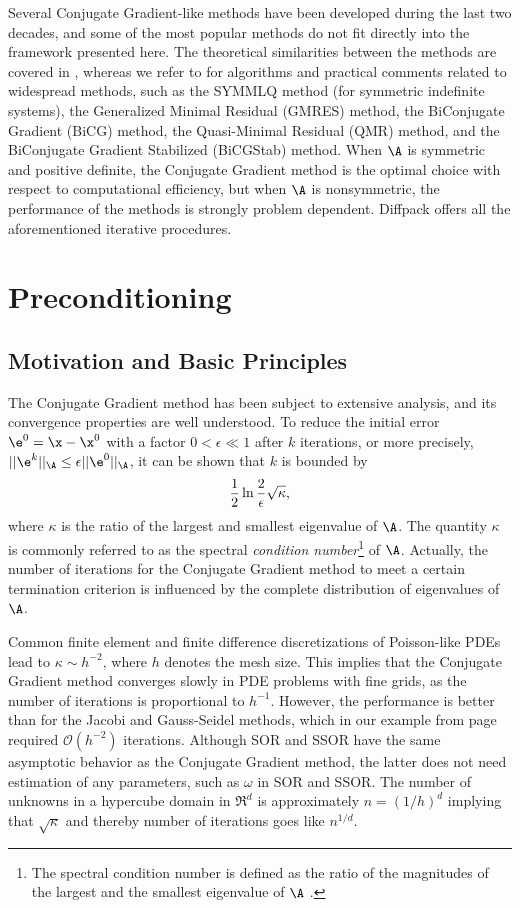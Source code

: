 Several Conjugate Gradient-like methods have been developed during the
last two decades, and some of the most popular methods do not fit
directly into the framework presented here.  The theoretical
similarities between the methods are covered in \cite{BruBok}, whereas
we refer to \cite{linalgtemplates93} for algorithms and practical
comments related to widespread methods, such as the SYMMLQ method (for
symmetric indefinite systems), the Generalized Minimal Residual
(GMRES) method, the BiConjugate Gradient (BiCG) method, the
Quasi-Minimal Residual (QMR) method, and the BiConjugate Gradient
Stabilized (BiCGStab) method.  When $\A$ is symmetric and positive
definite, the Conjugate Gradient method is the optimal choice with
respect to computational efficiency, but when $\A$ is nonsymmetric,
the performance of the methods is strongly problem dependent.
Diffpack offers all the aforementioned iterative procedures.


\section{Preconditioning}
\label{ch:linalg2:preconditioning}

\subsection{Motivation and Basic Principles}
\label{ch:linalg2:condno}
The Conjugate Gradient method has been subject to extensive analysis,
and its convergence properties are well understood.
To reduce the initial error $\e^0 =\x -\x^0$ with a factor
$0 <\epsilon\ll 1$ after $k$ iterations, or more precisely,
$||\e^k||_{\A}\leq\epsilon ||\e^0||_{\A}$, it can be shown that
$k$ is bounded by
\[  {1\over2}\ln{2\over\epsilon}\sqrt{\kappa},\]
where $\kappa$ is the ratio of the largest and smallest eigenvalue of
$\A$. The quantity $\kappa$  is commonly referred to as
the spectral \emph{condition number}\footnote{The spectral
condition number is defined as
the ratio of the magnitudes of the
largest and the smallest eigenvalue of $\A$ \cite[Ch.~2]{QuartValli94}.}
 of $\A$. Actually, the number of iterations
for the Conjugate Gradient method to meet a certain termination criterion
is influenced by the complete
distribution of eigenvalues of $\A$.

Common finite element and finite difference discretizations of
Poisson-like PDEs lead to $\kappa\sim h^{-2}$, where $h$ denotes the
mesh size. This implies that the Conjugate Gradient method converges
slowly in PDE problems with fine grids, as the number of iterations is
proportional to $h^{-1}$.  However, the performance is better than for
the Jacobi and Gauss-Seidel methods, which in our example from
page~\pageref{ch:linalg:SORconv} required $\mathcal{O}(h^{-2})$
iterations. Although SOR and SSOR have the same asymptotic behavior as
the Conjugate Gradient method, the latter does not need estimation of
any parameters, such as $\omega$ in SOR and SSOR.  The number of
unknowns in a hypercube domain in $\Re^d$ is approximately $n=(1/h)^d$
implying that $\sqrt{\kappa}$ and thereby number of iterations goes
like $n^{1/d}$.

